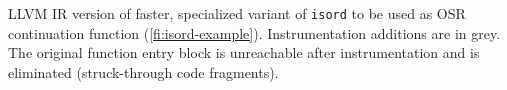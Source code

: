 \label{fig:isordascto} LLVM IR version of faster, specialized variant of {\tt isord} to be used as OSR continuation function (\myfigure\ref{fi:isord-example}). Instrumentation additions are in grey. The original function entry block is unreachable after instrumentation and is eliminated (struck-through code fragments).